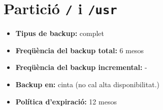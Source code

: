 
\section{Partici\'o {\tt /} i \tt{/usr}}%
\label{sec:part_sda1}

\newcommand{\entry}[2]{\item[] \textbf{#1:} #2}

\begin{itemize}
    \entry{Tipus de backup}{complet}
    \entry{Freqüència del backup total}{6 mesos}
    \entry{Freqüència del backup incremental}{-}
    \entry{Backup en}{cinta} (no cal alta disponibilitat.)
    \entry{Política d'expiració}{12 mesos}
\end{itemize}
